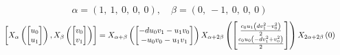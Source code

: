 \documentclass[11pt]{article}
\theoremstyle{definition}
\begin{document}
\[
\alpha = \left( 1, \  1, \  0, \  0, \  0\right), \quad \beta = \left( 0, \  -1, \  0, \  0, \  0\right)
\]
\[
\scaletoalign{\textwidth}{\left[ X_{\alpha}\left(\left[\begin{matrix}u_{0}\\u_{1}\end{matrix}\right]\right), X_{\beta}\left(\left[\begin{matrix}v_{0}\\v_{1}\end{matrix}\right]\right) \right] = X_{\alpha + \beta}\left(\left[\begin{matrix}- d u_{0} v_{1} - u_{1} v_{0}\\- u_{0} v_{0} - u_{1} v_{1}\end{matrix}\right]\right) X_{\alpha + 2\beta}\left(\left[\begin{matrix}\frac{c_{0} u_{1} \left(d v_{1}^{2} - v_{0}^{2}\right)}{2}\\\frac{c_{0} u_{0} \left(- d v_{1}^{2} + v_{0}^{2}\right)}{2}\end{matrix}\right]\right) X_{2\alpha + 2\beta}\left(0\right)}
\]
\end{document}
